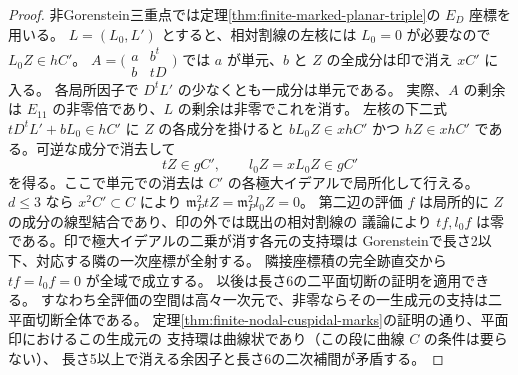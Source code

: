 \begin{proof}
非Gorenstein三重点では定理\ref{thm:finite-marked-planar-triple}の $E_D$ 座標を用いる。
$L=(L_0,L')$ とすると、相対割線の左核には $L_0=0$ が必要なので $L_0 Z\in h C'$。
$A=\bigl(\begin{smallmatrix}a&b^t\\b&tD\end{smallmatrix}\bigr)$ では
$a$ が単元、$b$ と $Z$ の全成分は印で消え $x C'$ に入る。
各局所因子で $D^t L'$ の少なくとも一成分は単元である。
実際、$A$ の剰余は $E_{11}$ の非零倍であり、$L$ の剰余は非零でこれを消す。
左核の下二式 $tD^t L'+b L_0\in h C'$ に $Z$ の各成分を掛けると
$b L_0 Z\in xh C'$ かつ $hZ\in xh C'$ である。可逆な成分で消去して
\[
                 t Z\in g C',\qquad l_0 Z=x L_0 Z\in g C'
\]
を得る。ここで単元での消去は $C'$ の各極大イデアルで局所化して行える。
$d\le3$ なら $x^2 C'\subset C$ により $\mathfrak m_P^2 t Z=\mathfrak m_P^2 l_0 Z=0$。
第二辺の評価 $f$ は局所的に $Z$ の成分の線型結合であり、印の外では既出の相対割線の
議論により $tf,l_0f$ は零である。印で極大イデアルの二乗が消す各元の支持環は
Gorensteinで長さ2以下、対応する隣の一次座標が全射する。
隣接座標積の完全跡直交から $tf=l_0 f=0$ が全域で成立する。
以後は長さ6の二平面切断の証明を適用できる。
すなわち全評価の空間は高々一次元で、非零ならその一生成元の支持は二平面切断全体である。
定理\ref{thm:finite-nodal-cuspidal-marks}の証明の通り、平面印におけるこの生成元の
支持環は曲線状であり（この段に曲線 $C$ の条件は要らない）、
長さ5以上で消える余因子と長さ6の二次補間が矛盾する。
\end{proof}

